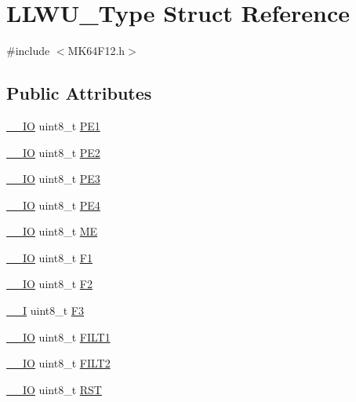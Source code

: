 \hypertarget{structLLWU__Type}{}\section{L\+L\+W\+U\+\_\+\+Type Struct Reference}
\label{structLLWU__Type}


{\ttfamily \#include $<$M\+K64\+F12.\+h$>$}

\subsection*{Public Attributes}
\begin{DoxyCompactItemize}
\item 
\hyperlink{core__sc300_8h_aec43007d9998a0a0e01faede4133d6be}{\+\_\+\+\_\+\+IO} uint8\+\_\+t \hyperlink{structLLWU__Type_af4e20147909cf3d6a8ec04750fc36833}{P\+E1}
\item 
\hyperlink{core__sc300_8h_aec43007d9998a0a0e01faede4133d6be}{\+\_\+\+\_\+\+IO} uint8\+\_\+t \hyperlink{structLLWU__Type_a95ff50f29c9dd8bb33ab20a0cbb24a67}{P\+E2}
\item 
\hyperlink{core__sc300_8h_aec43007d9998a0a0e01faede4133d6be}{\+\_\+\+\_\+\+IO} uint8\+\_\+t \hyperlink{structLLWU__Type_aea83255d229cf9f16973c2e2c289d084}{P\+E3}
\item 
\hyperlink{core__sc300_8h_aec43007d9998a0a0e01faede4133d6be}{\+\_\+\+\_\+\+IO} uint8\+\_\+t \hyperlink{structLLWU__Type_a3e7dd04bfade7dc646336a69827f8d8f}{P\+E4}
\item 
\hyperlink{core__sc300_8h_aec43007d9998a0a0e01faede4133d6be}{\+\_\+\+\_\+\+IO} uint8\+\_\+t \hyperlink{structLLWU__Type_aded2b9c734957e9882cefccb5029c51f}{ME}
\item 
\hyperlink{core__sc300_8h_aec43007d9998a0a0e01faede4133d6be}{\+\_\+\+\_\+\+IO} uint8\+\_\+t \hyperlink{structLLWU__Type_a7a06923d73cbfb32196f92cec9832679}{F1}
\item 
\hyperlink{core__sc300_8h_aec43007d9998a0a0e01faede4133d6be}{\+\_\+\+\_\+\+IO} uint8\+\_\+t \hyperlink{structLLWU__Type_a2e0cf4aaae8993a69589806facbdb943}{F2}
\item 
\hyperlink{core__sc300_8h_af63697ed9952cc71e1225efe205f6cd3}{\+\_\+\+\_\+I} uint8\+\_\+t \hyperlink{structLLWU__Type_a3c0a1985283644dfd4d68600e899b55f}{F3}
\item 
\hyperlink{core__sc300_8h_aec43007d9998a0a0e01faede4133d6be}{\+\_\+\+\_\+\+IO} uint8\+\_\+t \hyperlink{structLLWU__Type_aa94a3a9f881724ef6ed7658e387aa159}{F\+I\+L\+T1}
\item 
\hyperlink{core__sc300_8h_aec43007d9998a0a0e01faede4133d6be}{\+\_\+\+\_\+\+IO} uint8\+\_\+t \hyperlink{structLLWU__Type_a5736205996ff7fc8e4eba49f8f0e44ea}{F\+I\+L\+T2}
\item 
\hyperlink{core__sc300_8h_aec43007d9998a0a0e01faede4133d6be}{\+\_\+\+\_\+\+IO} uint8\+\_\+t \hyperlink{structLLWU__Type_ace78cf7cc590f959ee7485ef82661ab3}{R\+ST}
\end{DoxyCompactItemize}


